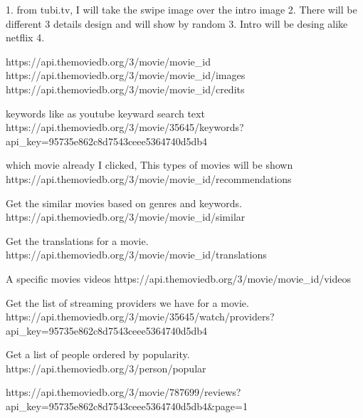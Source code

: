 1. from tubi.tv, I will take the swipe image over the intro image
2. There will be different 3 details design and will show by random
3. Intro will be desing alike netflix
4.

https://api.themoviedb.org/3/movie/{movie_id}
https://api.themoviedb.org/3/movie/{movie_id}/images
https://api.themoviedb.org/3/movie/{movie_id}/credits

keywords like as youtube keyward search text
https://api.themoviedb.org/3/movie/35645/keywords?api_key=95735e862c8d7543ceee5364740d5db4

which movie already I clicked, This types of movies will be shown
https://api.themoviedb.org/3/movie/{movie_id}/recommendations

Get the similar movies based on genres and keywords.
https://api.themoviedb.org/3/movie/{movie_id}/similar

Get the translations for a movie.
https://api.themoviedb.org/3/movie/{movie_id}/translations

A specific movies videos
https://api.themoviedb.org/3/movie/{movie_id}/videos

Get the list of streaming providers we have for a movie.
https://api.themoviedb.org/3/movie/35645/watch/providers?api_key=95735e862c8d7543ceee5364740d5db4

Get a list of people ordered by popularity.
https://api.themoviedb.org/3/person/popular

https://api.themoviedb.org/3/movie/787699/reviews?api_key=95735e862c8d7543ceee5364740d5db4&page=1